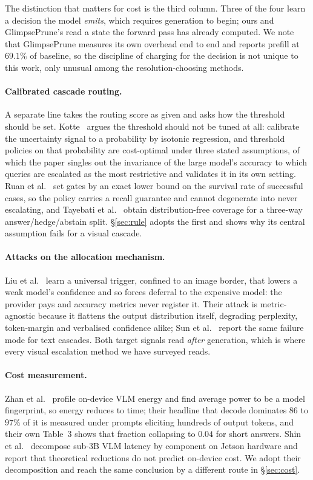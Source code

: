 \documentclass[10pt,twocolumn]{article}
\theoremstyle{plain}
\begin{document}
The distinction that matters for cost is the third column. Three of the four
learn a decision the model \emph{emits}, which requires generation to begin;
ours and GlimpsePrune's read a state the forward pass has already computed. We
note that GlimpsePrune measures its own overhead end to end and reports prefill
at $69.1\%$ of baseline, so the discipline of charging for the decision is not
unique to this work, only unusual among the resolution-choosing methods.

\paragraph{Calibrated cascade routing.} A separate line takes the routing score
as given and asks how the threshold should be set. Kotte~\cite{ucci} argues the
threshold should not be tuned at all: calibrate the uncertainty signal to a
probability by isotonic regression, and threshold policies on that probability
are cost-optimal under three stated assumptions, of which the paper singles out
the invariance of the large model's accuracy to which queries are escalated as
the most restrictive and validates it in its own setting. Ruan et al.~\cite{recall} set
gates by an exact lower bound on the survival rate of successful cases, so the
policy carries a recall guarantee and cannot degenerate into never escalating,
and Tayebati et al.~\cite{conformal} obtain distribution-free coverage for a
three-way answer/hedge/abstain split. \S\ref{sec:rule} adopts the first and
shows why its central assumption fails for a visual cascade.

\paragraph{Attacks on the allocation mechanism.} Liu et al.~\cite{deferral}
learn a universal trigger, confined to an image border, that lowers a weak
model's confidence and so forces deferral to the expensive model: the provider
pays and accuracy metrics never register it. Their attack is metric-agnostic
because it flattens the output distribution itself, degrading perplexity,
token-margin and verbalised confidence alike; Sun et al.~\cite{cascadefail}
report the same failure mode for text cascades. Both target signals read
\emph{after} generation, which is where every visual escalation method we have
surveyed reads.

\paragraph{Cost measurement.} Zhan et al.~\cite{energy} profile on-device VLM
energy and find average power to be a model fingerprint, so energy reduces to
time; their headline that decode dominates $86$ to $97\%$ of it is measured
under prompts eliciting hundreds of output tokens, and their own Table~3 shows
that fraction collapsing to $0.04$ for short answers. Shin et
al.~\cite{quantization} decompose sub-3B VLM latency by component on Jetson
hardware and report that theoretical reductions do not predict on-device cost.
We adopt their decomposition and reach the same conclusion by a different
route in \S\ref{sec:cost}.
\end{document}
